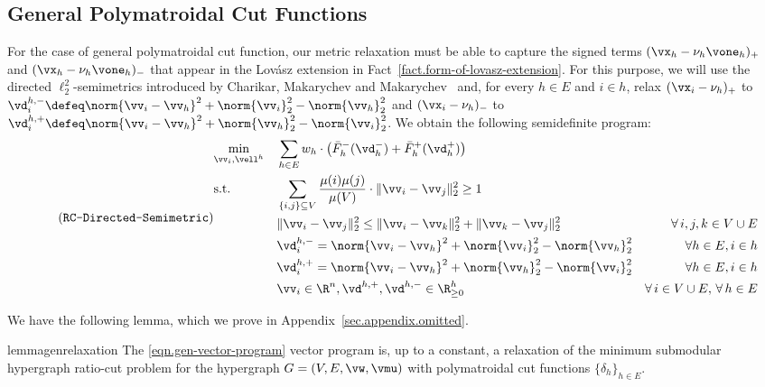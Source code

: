 \documentclass[letterpaper]{article}
\begin{document}
\subsection{General Polymatroidal Cut Functions}
\label{sec.general}

For the case of general polymatroidal cut function, our metric relaxation must be able to capture the signed terms $(\vx_h - \nu_h \vone_h)_+$ and $(\vx_h - \nu_h \vone_h)_-$ that appear in the Lov\'asz extension in Fact~\ref{fact.form-of-lovasz-extension}. For this purpose, we will use the directed $\ell_2^2$-semimetrics introduced by Charikar, Makarychev and Makarychev~\cite{charikar2006directed} and, for every $h \in E$ and $i \in h$, relax $(\vx_i - \nu_h)_+$ to $\vd^{h,-}_i \defeq \norm{\vv_i - \vv_h}^2 + \norm{\vv_i}_2^2- \norm{\vv_h}_2^2$ and $(\vx_i - \nu_h)_-$ to $\vd^{h,+}_i \defeq \norm{\vv_i - \vv_h}^2 + \norm{\vv_h}_2^2- \norm{\vv_i}_2^2$.
We obtain the following semidefinite program:
\begin{equation*}
\stepcounter{equation}
\tag{\texttt{RC-Directed-Semimetric}}
\label{eqn.gen-vector-program}
\begin{aligned}
& \underset{\vv_i, \vell^h}{\min}
& & \sum_{h \in E} w_h \cdot \left(\bar{F}_h^-(\vd_h^-) + \bar{F}_h^+(\vd_h^+) \right)\\
& \textup{s.t.}
& & \sum_{\{i,j\} \subseteq V} {\mu(i) \mu(j) \over \mu(V)} \cdot \|\vv_i - \vv_j\|_2^2 \geq 1 \\
& & & \|\vv_i -\vv_j \|^2_2 \leq \|\vv_i - \vv_k \|_2^2 + \|\vv_k - \vv_j\|_2^2
& \forall \, i, j, k \in V \cup E \\
& & & \vd^{h,-}_i = \norm{\vv_i - \vv_h}^2 + \norm{\vv_i}_2^2- \norm{\vv_h}_2^2
& \forall h \in E, i \in h\\
& & & \vd^{h,+}_i = \norm{\vv_i - \vv_h}^2 + \norm{\vv_h}_2^2- \norm{\vv_i}_2^2
& \forall h \in E, i \in h\\
& & & \vv_i \in \R^n, \vd^{h,+}, \vd^{h,-} \in \R^h_{\geq 0}
& \forall \, i \in V \cup E, \, \forall \, h \in E
\end{aligned}
\end{equation*}

We have the following lemma, which we prove in  Appendix~\ref{sec.appendix.omitted}.
\begin{restatable}{lemma}{genrelaxation}
    The \eqref{eqn.gen-vector-program} vector program is, up to a constant, a relaxation of the minimum submodular hypergraph ratio-cut problem for the hypergraph $G=(V,E,\vw,\vmu)$ with polymatroidal cut functions $\{\delta_h\}_{h \in E}.$
\end{restatable}
\end{document}

